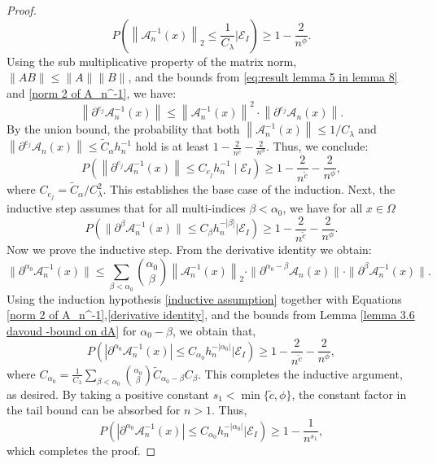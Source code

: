 \documentclass{article}
\begin{document}
\begin{proof}
\begin{equation}
P\left(\left\|\mathscr{A}_n^{-1}(x)\right\|_2 \leq \frac{1}{C_\lambda} \Big|\mathscr{E}_I\right)\geq 1-\frac{2}{n^{\phi}}.
\label{norm 2 of A_n^-1}
\end{equation}
Using the sub multiplicative property of the matrix norm, $\|AB\|\leq\|A\|\|B\|$, and the bounds from \eqref{eq:result lemma 5 in lemma 8} and \eqref{norm 2 of A_n^-1}, we have:
$$
\left\|\partial^{e_j} \mathscr{A}_n^{-1}(x)\right\| \leq\left\|\mathscr{A}_n^{-1}(x)\right\|^2 \cdot\left\|\partial^{e_j} \mathscr{A}_n(x)\right\|.
$$
By the union bound, the probability that both $\left\|\mathscr{A}_n^{-1}(x)\right\| \leq 1 / C_\lambda$ and $\left\|\partial^{e_j} \mathscr{A}_n(x)\right\| \leq \tilde{C}_\alpha h_n^{-1}$ hold is at least $1-\frac{2}{n^{\bar{c}}}-\frac{2}{n^\phi}$. Thus, we conclude:
$$
P\left(\left\|\partial^{e_j} \mathscr{A}_n^{-1}(x)\right\| \leq C_{e_j} h_n^{-1} \mid \mathscr{E}_I\right) \geq 1-\frac{2}{n^{\tilde{c}}}-\frac{2}{n^\phi},
$$
where $C_{e_j}=\tilde{C}_\alpha / C_\lambda^2$.
This establishes the base case of the induction.
Next, the inductive step
assumes that for all multi-indices $\beta<\alpha_0$, we have for all $x \in \Omega$
\begin{equation}
    P\left(\|\partial^\beta \mathscr{A}_n^{-1}(x)\|\leq C_\beta h_n^{-|\beta|}\Big| \mathscr{E}_I\right)\geq 1-\frac{2}{n^{\tilde{c} }}-\frac{2}{n^{\phi}}.
    \label{inductive assumption}
\end{equation}
Now we prove the inductive step. From the derivative identity we obtain:
\begin{equation}
   \|\partial^{\alpha_0} \mathscr{A}_n^{-1}(x)\| \leq \sum_{\beta<\alpha_0}\binom{\alpha_0}{\beta}\left\|\mathscr{A}_n^{-1}(x)\right\|_2 \cdot\|\partial^{\alpha_0-\beta} \mathscr{A}_n(x)\| \cdot\|\partial^\beta \mathscr{A}_n^{-1}(x)\| .
    \label{derivative identity}
\end{equation}
Using the induction hypothesis \eqref{inductive assumption} together with Equations \eqref{norm 2 of A_n^-1},\eqref{derivative identity}, and the bounds from Lemma \ref{lemma 3.6 davoud -bound on dA} for $\alpha_0-\beta$, we obtain that,
$$
P\left(|\partial^{\alpha_0} \mathscr{A}_n^{-1}({x})|\leq C_{\alpha_0} h_n^{-|\alpha_0|}\Big|\mathscr{E}_I\right)\geq 1-\frac{2}{n^{\tilde{c}}}-\frac{2}{n^{\phi}},
$$
where $C_{\alpha_0}=\frac{1}{C_\lambda} \sum_{\beta<\alpha_0}\binom{\alpha_0}{\beta} \tilde{C}_{\alpha_0-\beta} C_\beta$.
This completes the inductive argument, as desired. 
By taking a positive constant  $s_1<\min\{\tilde{c},\phi\}$, the constant factor in the tail bound can be absorbed for $n>1$. Thus,
$$
P\left(|\partial^{\alpha_0} \mathscr{A}_n^{-1}({x})|\leq C_{\alpha_0} h_n^{-|\alpha_0|}\Big|\mathscr{E}_I\right)\geq 1-\frac{1}{n^{s_1}},
$$
which completes the proof. 
\end{proof}
\end{document}
